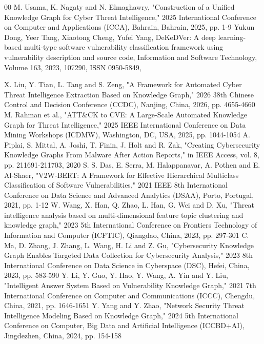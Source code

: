 \documentclass[conference]{IEEEtran}
\begin{document}

\begin{thebibliography}{00}
M. Usama, K. Nagaty and N. Elmaghawry, "Construction of a Unified Knowledge Graph for Cyber Threat Intelligence," 2025 International Conference on Computer and Applications (ICCA), Bahrain, Bahrain, 2025, pp. 1-9
Yukun Dong, Yeer Tang, Xiaotong Cheng, Yufei Yang,
DeKeDVer: A deep learning-based multi-type software vulnerability classification framework using vulnerability description and source code,
Information and Software Technology,
Volume 163,
2023,
107290,
ISSN 0950-5849,

X. Liu, Y. Tian, L. Tang and S. Zeng, "A Framework for Automated Cyber Threat Intelligence Extraction Based on Knowledge Graph," 2026 38th Chinese Control and Decision Conference (CCDC), Nanjing, China, 2026, pp. 4655-4660
M. Rahman et al., "ATT\&CK to CVE: A Large-Scale Automated Knowledge Graph for Threat Intelligence," 2025 IEEE International Conference on Data Mining Workshops (ICDMW), Washington, DC, USA, 2025, pp. 1044-1054
A. Piplai, S. Mittal, A. Joshi, T. Finin, J. Holt and R. Zak, "Creating Cybersecurity Knowledge Graphs From Malware After Action Reports," in IEEE Access, vol. 8, pp. 211691-211703, 2020
S. S. Das, E. Serra, M. Halappanavar, A. Pothen and E. Al-Shaer, "V2W-BERT: A Framework for Effective Hierarchical Multiclass Classification of Software Vulnerabilities," 2021 IEEE 8th International Conference on Data Science and Advanced Analytics (DSAA), Porto, Portugal, 2021, pp. 1-12
W. Wang, X. Han, Q. Zhao, L. Han, G. Wei and D. Xu, "Threat intelligence analysis based on multi-dimensional feature topic clustering and knowledge graph," 2023 5th International Conference on Frontiers Technology of Information and Computer (ICFTIC), Qiangdao, China, 2023, pp. 297-301
C. Ma, D. Zhang, J. Zhang, L. Wang, H. Li and Z. Gu, "Cybersecurity Knowledge Graph Enables Targeted Data Collection for Cybersecurity Analysis," 2023 8th International Conference on Data Science in Cyberspace (DSC), Hefei, China, 2023, pp. 583-590
Y. Li, Y. Guo, Y. Hao, Y. Wang, A. Yin and Y. Liu, "Intelligent Answer System Based on Vulnerability Knowledge Graph," 2021 7th International Conference on Computer and Communications (ICCC), Chengdu, China, 2021, pp. 1646-1651
Y. Yang and Y. Zhao, "Network Security Threat Intelligence Modeling Based on Knowledge Graph," 2024 5th International Conference on Computer, Big Data and Artificial Intelligence (ICCBD+AI), Jingdezhen, China, 2024, pp. 154-158

\end{thebibliography}
\end{document}
